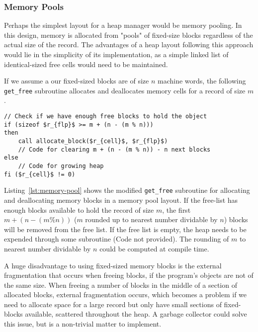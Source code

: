 \subsubsection{Memory Pools}
Perhaps the simplest layout for a heap manager would be memory pooling. In this design, memory is allocated from "pools" of fixed-size blocks regardless of the actual size of the record. The advantages of a heap layout following this approach would lie in the simplicity of its implementation, as a simple linked list of identical-sized free cells would need to be maintained. 

If we assume a our fixed-sized blocks are of size $n$ machine words, the following \texttt{get\_free} subroutine allocates and deallocates memory cells for a record of size $m$.

\begin{lstlisting}[mathescape=true, caption={Allocating and deallocating records of size $m$ using block of a fixed size $n$. Code modified from~\cite{ha:heap}}, language=janus, style=basic,label={lst:memory-pool}]
// Check if we have enough free blocks to hold the object 
if (sizeof $r_{flp}$ >= m + (n - (m % n))) 
then
    call allocate_block($r_{cell}$, $r_{flp}$)
    // Code for clearing m + (n - (m % n)) - n next blocks 
else 
	// Code for growing heap
fi ($r_{cell}$ != 0)
\end{lstlisting}

Listing~\ref{lst:memory-pool} shows the modified \texttt{get\_free} subroutine for allocating and deallocating memory blocks in a memory pool layout. If the free-list has enough blocks available to hold the record of size $m$, the first $m + (n - (m \% n))$ ($m$ rounded up to nearest number dividable by $n$) blocks will be removed from the free list. If the free list is empty, the heap needs to be expended through some subroutine (Code not provided). The rounding of $m$ to nearest number dividable by $n$ could be computed at compile time.

A huge disadvantage to using fixed-sized memory blocks is the external fragmentation that occurs when freeing blocks, if the program's objects are not of the same size. When freeing a number of blocks in the middle of a section of allocated blocks, external fragmentation occurs, which becomes a problem if we need to allocate space for a large record but only have small sections of fixed-blocks available, scattered throughout the heap. A garbage collector could solve this issue, but is a non-trivial matter to implement.

